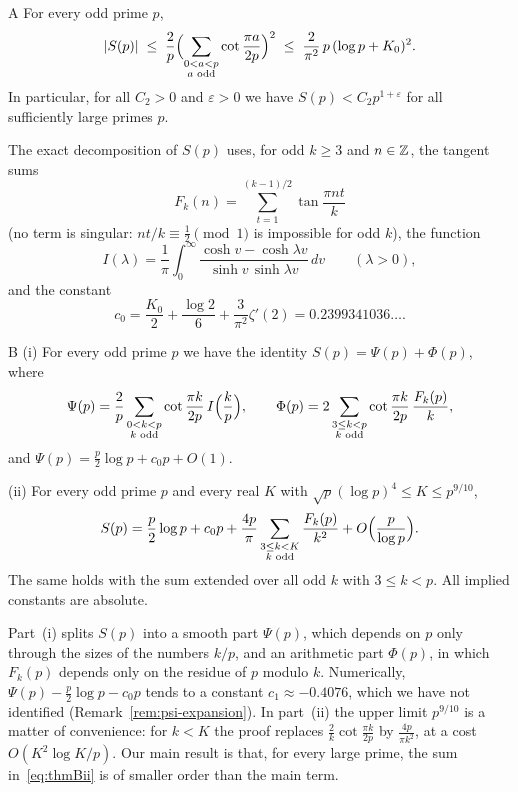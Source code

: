 \begin{namedthm}{A}\label{thm:A}
For every odd prime $p$,
\[
|S(p)|\;\le\;\frac2p\Bigl(\sum_{\substack{0<a<p\\ a\text{ odd}}}\cot\frac{\pi a}{2p}\Bigr)^2\;\le\;\frac2{\pi^2}\,p\,(\log p+K_0)^2.
\]
In particular, for all $C_2>0$ and $\varepsilon>0$ we have $S(p)<C_2p^{1+\varepsilon}$ for all sufficiently large primes $p$.
\end{namedthm}

The exact decomposition of $S(p)$ uses, for odd $k\ge3$ and $n\in\mathbb{Z}$, the tangent sums
\begin{equation}\label{eq:Fk}
F_k(n)=\sum_{t=1}^{(k-1)/2}\tan\frac{\pi nt}k
\end{equation}
(no term is singular: $nt/k\equiv\frac12\pmod1$ is impossible for odd $k$), the function
\begin{equation}\label{eq:I}
I(\lambda)=\frac1\pi\int_0^\infty\frac{\cosh v-\cosh\lambda v}{\sinh v\,\sinh\lambda v}\,dv\qquad(\lambda>0),
\end{equation}
and the constant
\begin{equation}\label{eq:c0}
c_0=\frac{K_0}2+\frac{\log2}6+\frac3{\pi^2}\zeta'(2)=0.2399341036\ldots.
\end{equation}

\begin{namedthm}{B}\label{thm:B}
\textup{(i)} For every odd prime $p$ we have the identity $S(p)=\Psi(p)+\Phi(p)$, where
\[
\Psi(p)=\frac2p\sum_{\substack{0<k<p\\ k\text{ odd}}}\cot\frac{\pi k}{2p}\,I\Bigl(\frac kp\Bigr),\qquad\Phi(p)=2\sum_{\substack{3\le k<p\\ k\text{ odd}}}\cot\frac{\pi k}{2p}\,\frac{F_k(p)}k,
\]
and $\Psi(p)=\frac p2\log p+c_0p+O(1)$.

\textup{(ii)} For every odd prime $p$ and every real $K$ with $\sqrt p(\log p)^4\le K\le p^{9/10}$,
\begin{equation}\label{eq:thmBii}
S(p)=\frac p2\log p+c_0p+\frac{4p}\pi\sum_{\substack{3\le k<K\\ k\text{ odd}}}\frac{F_k(p)}{k^2}+O\Bigl(\frac p{\log p}\Bigr).
\end{equation}
The same holds with the sum extended over all odd $k$ with $3\le k<p$. All implied constants are absolute.
\end{namedthm}

Part~(i) splits $S(p)$ into a smooth part $\Psi(p)$, which depends on $p$ only through the sizes of the numbers $k/p$, and an arithmetic part $\Phi(p)$, in which $F_k(p)$ depends only on the residue of $p$ modulo $k$. Numerically, $\Psi(p)-\frac p2\log p-c_0p$ tends to a constant $c_1\approx-0.4076$, which we have not identified (Remark~\ref{rem:psi-expansion}). In part~(ii) the upper limit $p^{9/10}$ is a matter of convenience: for $k<K$ the proof replaces $\frac2k\cot\frac{\pi k}{2p}$ by $\frac{4p}{\pi k^2}$, at a cost $O(K^2\log K/p)$. Our main result is that, for every large prime, the sum in~\eqref{eq:thmBii} is of smaller order than the main term.


